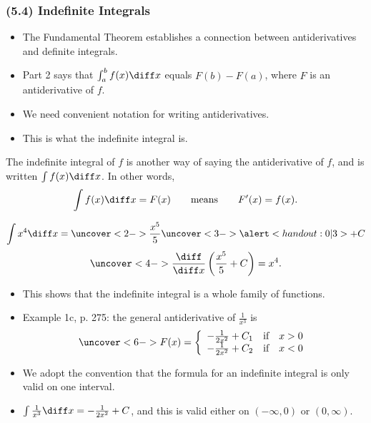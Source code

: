 \begin{frame}\frametitle{(5.4) Indefinite Integrals}
\begin{itemize}
\item  The Fundamental Theorem establishes a connection between antiderivatives and definite integrals.
\item  Part 2 says that $\int_a^b f(x)\diff x$ equals $F(b) - F(a)$, where $F$ is an antiderivative of $f$.
\item  We need convenient notation for writing antiderivatives.
\item  This is what the indefinite integral is.
\end{itemize}
\begin{definition}
The indefinite integral of $f$ is another way of saying the antiderivative of $f$, and is written $\int f(x) \diff x$.  In other words,
\abovedisplayskip=0pt
\belowdisplayskip=0pt
\[
\int f(x) \diff x = F(x) \qquad \textrm{means}\qquad F'(x) = f(x).
\]
\end{definition}
\end{frame}

\begin{frame}
\begin{example}
\abovedisplayskip=0pt
\belowdisplayskip=0pt
\[
\int x^4 \diff x = \uncover<2->{\frac{x^5}{5}} \uncover<3->{\alert<handout:0| 3>{+ C}}
\]
\abovedisplayskip=0pt
\belowdisplayskip=0pt
\[
\uncover<4->{\frac{\diff}{\diff x}\left( \frac{x^5}{5} + C\right) = x^4.}
\]
\end{example}
\begin{itemize}
\item<5->  This shows that the indefinite integral is a whole family of functions.
\item<6->  Example 1c, p. 275:  the general antiderivative of $\frac{1}{x^3}$ is
\abovedisplayskip=0pt
\belowdisplayskip=0pt
\[
\uncover<6->{%
F(x) = \left\{ \begin{array}{ccc}
-\frac{1}{2x^2} + C_1 & \textrm{if} & x > 0\\
-\frac{1}{2x^2} + C_2 & \textrm{if} & x < 0
\end{array}\right.
}%
\]
\item<7->  We adopt the convention that the formula for an indefinite integral is only valid on one interval.
\item<8->  $\int \frac{1}{x^3} \diff x = -\frac{1}{2x^2} + C$, and this is valid either on $(-\infty , 0)$ or $(0, \infty)$.
\end{itemize}
\end{frame}
